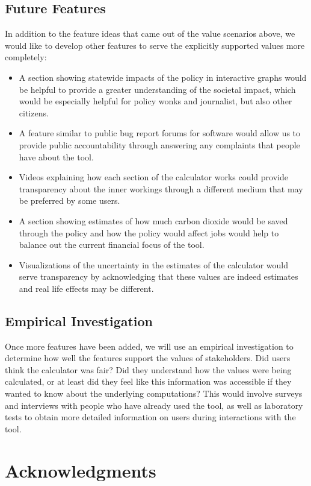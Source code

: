 \documentclass{sigchi}
\begin{document}
\subsection{Future Features}
In addition to the feature ideas that came out of the value scenarios above, we would like to develop other features to serve the explicitly supported values more completely:
\begin{itemize}
\item A section showing statewide impacts of the policy in interactive graphs would be helpful 
to provide a greater understanding of the societal impact, which would be especially helpful 
for policy wonks and journalist, but also other citizens. 
\item A feature similar to public bug report forums for software would allow us to provide 
public accountability through answering any complaints that people have about the tool. 
\item Videos explaining how each section of the calculator works could provide transparency 
about the inner workings through a different medium that may be preferred by some users. 
\item A section showing estimates of how much carbon dioxide would be saved through the policy and how the policy would affect jobs would 
help to balance out the current financial focus of the tool. 
\item Visualizations of the uncertainty in the estimates of the calculator would serve transparency 
by acknowledging that these values are indeed estimates and real life effects may be different. 

\end{itemize}

\subsection{Empirical Investigation}
Once more features have been added, we will use an empirical investigation to determine how well 
the features support the values of stakeholders. 
Did users think the calculator was fair? Did they understand how the values were being calculated, 
or at least did they feel like this information was accessible if they wanted to know 
about the underlying computations? This would involve 
surveys and interviews with people who have already used the tool, as well as laboratory tests 
to obtain more detailed information on users during interactions with the tool. 

\section{Acknowledgments}
\end{document}
